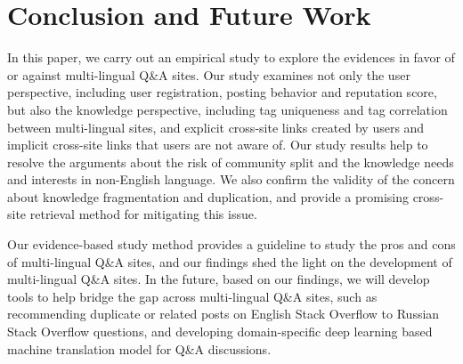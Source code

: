 \section{Conclusion and Future Work}

In this paper, we carry out an empirical study to explore the evidences in favor of or against multi-lingual Q\&A sites.
Our study examines not only the user perspective, including user registration, posting behavior and reputation score, but also the knowledge perspective, including tag uniqueness and tag correlation between multi-lingual sites, and explicit cross-site links created by users and implicit cross-site links that users are not aware of.
Our study results help to resolve the arguments about the risk of community split and the knowledge needs and interests in non-English language.
We also confirm the validity of the concern about knowledge fragmentation and duplication, and provide a promising cross-site retrieval method for mitigating this issue.

Our evidence-based study method provides a guideline to study the pros and cons of multi-lingual Q\&A sites, and our findings shed the light on the development of multi-lingual Q\&A sites.
In the future, based on our findings, we will develop tools to help bridge the gap across multi-lingual Q\&A sites, such as recommending duplicate or related posts on English Stack Overflow to Russian Stack Overflow questions, and developing domain-specific deep learning based machine translation model for Q\&A discussions.

\begin{comment}
show the influence of the launch of multi-lingual Stack Overflow.
We first spot the fierce debate of the decision of building multi-lingual Stack Overflow, and obtain the pros and cons by analysing users' comments under the announcement of the new sites.
To validate the benefits and concerns, we carry out quantitative empirical study between English Stack Overflow and Russian Stack Overflow from both user and content aspects.
The results show the value of existence of multi-lingual Stack Overflow and resolve some concerns like community split of the main site.
Some concerns are also confirmed such as knowledge fragmentation and content duplication.
These discoveries can play an important criteria to guide the future development of not only multi-lingual Stack Overflow, but also other Q\&A sites like Quora.
\end{comment}



\par

